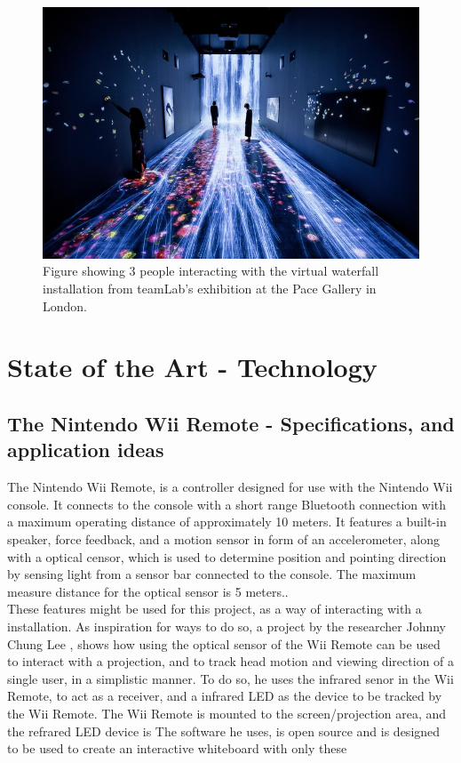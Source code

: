     \begin{figure}[H]
    	\centering
    	\includegraphics[width=0.9\linewidth]{figure/Analysis/transcendingBoundaries.jpg}
    	\caption{Figure showing 3 people interacting with the virtual waterfall installation from teamLab's exhibition at the Pace Gallery in London\cite{transcendingBoundries}.}
    	\label{fig:transcendingBoundaries}
    \end{figure}
    
\section{State of the Art - Technology}
    
\subsection{The Nintendo Wii Remote - Specifications, and application ideas} %
The Nintendo Wii Remote, is a controller designed for use with the Nintendo Wii console. It connects to the console with a short range Bluetooth connection with a maximum operating distance of approximately 10 meters\cite{WiimoteWIKI}\cite{WiimoteSpecs}. It features a built-in speaker, force feedback, and a motion sensor in form of an accelerometer, along with a optical censor, which is used to determine position and pointing direction by sensing light from a sensor bar connected to the console. The maximum measure distance for the optical sensor is 5 meters.\cite{WiimoteWIKI}. \\
These features might be used for this project, as a way of interacting with a installation. As inspiration for ways to do so, a project by the researcher Johnny Chung Lee \cite{JohnnyLeeWiiMote}, shows how using the optical sensor of the Wii Remote can be used to interact with a projection, and to track head motion and viewing direction of a single user, in a simplistic manner. To do so, he uses the infrared senor in the Wii Remote, to act as a receiver, and a infrared LED as the device to be tracked by the Wii Remote. The Wii Remote is mounted to the screen/projection area, and the refrared LED device is  The software he uses, is open source and is designed to be used to create an interactive whiteboard with only these       

